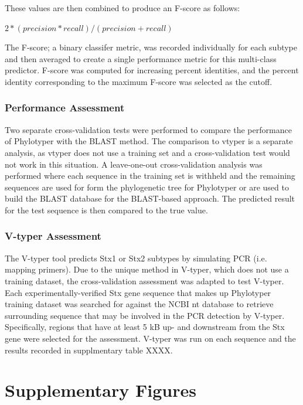 \documentclass[11pt,letterpaper]{article}
\begin{document}
These values are then combined to produce an F-score as follows:

$2 * ( precision * recall ) / ( precision + recall )$

The F-score; a binary classifer metric, was recorded individually for each subtype and then averaged to create a single performance metric for this multi-class predictor.  F-score was computed for increasing percent identities, and the percent identity corresponding to the maximum F-score was selected as the cutoff.

\subsubsection{Performance Assessment}

Two separate cross-validation tests were performed to compare the performance of Phylotyper with the BLAST method. The comparison to vtyper is a separate analysis, as vtyper does not use a training set and a cross-validation test would not work in this situation. A leave-one-out cross-validation analysis was performed where each sequence in the training set is withheld and the remaining sequences are used for form the phylogenetic tree for Phylotyper or are used to build the BLAST database for the BLAST-based approach. The predicted result for the test sequence is then compared to the true value.

\subsubsection{V-typer Assessment}

The V-typer tool predicts Stx1 or Stx2 subtypes by simulating PCR (i.e. mapping primers). Due to the unique method in V-typer,  which does not use a training dataset, the cross-validation assessment was adapted to test V-typer. Each experimentally-verified Stx gene sequence that makes up Phylotyper training dataset was searched for against the NCBI nt database to retrieve surrounding sequence that may be involved in the PCR detection by V-typer.  Specifically, regions that have at least 5 kB up- and downstream from the Stx gene were selected for the assessment. V-typer was run on each sequence and the results recorded in supplmentary table XXXX.


\section{Supplementary Figures}
\end{document}
